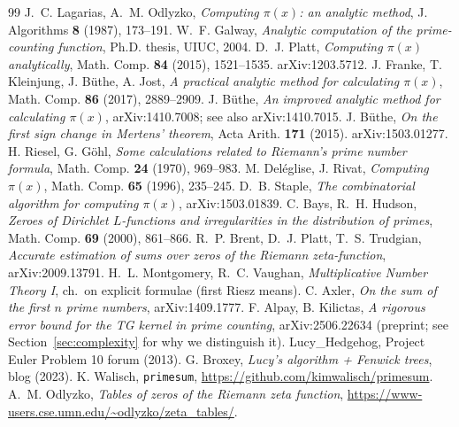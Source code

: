 \documentclass[11pt]{article}
\begin{document}
\begin{thebibliography}{99}
 J.~C. Lagarias, A.~M. Odlyzko, \emph{Computing $\pi(x)$: an
analytic method}, J. Algorithms \textbf{8} (1987), 173--191.
 W.~F. Galway, \emph{Analytic computation of the
prime-counting function}, Ph.D. thesis, UIUC, 2004.
 D.~J. Platt, \emph{Computing $\pi(x)$ analytically},
Math. Comp. \textbf{84} (2015), 1521--1535. arXiv:1203.5712.
 J. Franke, T. Kleinjung, J. B\"uthe, A. Jost, \emph{A
practical analytic method for calculating $\pi(x)$}, Math. Comp.
\textbf{86} (2017), 2889--2909.
 J. B\"uthe, \emph{An improved analytic method for
calculating $\pi(x)$}, arXiv:1410.7008; see also arXiv:1410.7015.
 J. B\"uthe, \emph{On the first sign change in Mertens'
theorem}, Acta Arith. \textbf{171} (2015). arXiv:1503.01277.
 H. Riesel, G. G\"ohl, \emph{Some calculations related to
Riemann's prime number formula}, Math. Comp. \textbf{24} (1970), 969--983.
 M. Del\'eglise, J. Rivat, \emph{Computing $\pi(x)$},
Math. Comp. \textbf{65} (1996), 235--245.
 D.~B. Staple, \emph{The combinatorial algorithm for
computing $\pi(x)$}, arXiv:1503.01839.
 C. Bays, R.~H. Hudson, \emph{Zeroes of Dirichlet
$L$-functions and irregularities in the distribution of primes}, Math.
Comp. \textbf{69} (2000), 861--866.
 R.~P. Brent, D.~J. Platt, T.~S. Trudgian, \emph{Accurate
estimation of sums over zeros of the Riemann zeta-function},
arXiv:2009.13791.
 H.~L. Montgomery, R.~C. Vaughan, \emph{Multiplicative Number
Theory I}, ch.\ on explicit formulae (first Riesz means).
 C. Axler, \emph{On the sum of the first $n$ prime
numbers}, arXiv:1409.1777.
 F. Alpay, B. Kilictas, \emph{A rigorous error bound for the
TG kernel in prime counting}, arXiv:2506.22634 (preprint; see
Section~\ref{sec:complexity} for why we distinguish it).
 Lucy\_Hedgehog, Project Euler Problem 10 forum (2013).
 G. Broxey, \emph{Lucy's algorithm + Fenwick trees},
blog (2023).
 K. Walisch, \texttt{primesum},
\url{https://github.com/kimwalisch/primesum}.
 A.~M. Odlyzko, \emph{Tables of zeros of the Riemann zeta
function}, \url{https://www-users.cse.umn.edu/~odlyzko/zeta_tables/}.
\end{thebibliography}
\end{document}
